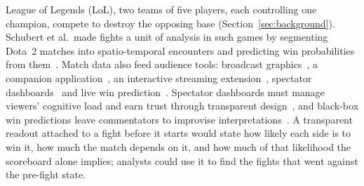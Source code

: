  League of Legends (LoL), two teams of five players, each controlling one
champion, compete to destroy the opposing base (Section~\ref{sec:background}). Schubert et al.\
made fights a unit of analysis in such games by segmenting Dota~2 matches into spatio-temporal
encounters and predicting win probabilities from them~\cite{schubert2016encounter}. Match data also
feed audience tools: broadcast graphics~\cite{block2018narrative}, a companion
application~\cite{kokkinakis2020dax}, an interactive streaming
extension~\cite{pedrassoli2024passive}, spectator dashboards~\cite{charleer2018dashboards} and live
win prediction~\cite{hodge2021win}. Spectator dashboards must manage viewers' cognitive load and
earn trust through transparent design~\cite{charleer2018dashboards}, and black-box win predictions
leave commentators to improvise interpretations~\cite{pedrassoli2024wincondition}. A transparent
readout attached to a fight before it starts would state how likely each side is to win it, how
much the match depends on it, and how much of that likelihood the scoreboard alone implies;
analysts could use it to find the fights that went against the pre-fight state.

